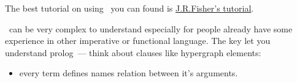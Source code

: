 
The best tutorial on using \prolog\ you can found is
\href{https://www.cpp.edu/~jrfisher/www/prolog_tutorial/contents.html}{J.R.Fisher's
tutorial}.

\bigskip
\prolog\ can be very complex to understand especially for people already have
some experience in other imperative or functional language. The key let you
understand prolog\ --- think about clauses like hypergraph elements:
\begin{itemize}
  \item 
every term defines names relation between it's arguments.
\end{itemize}
